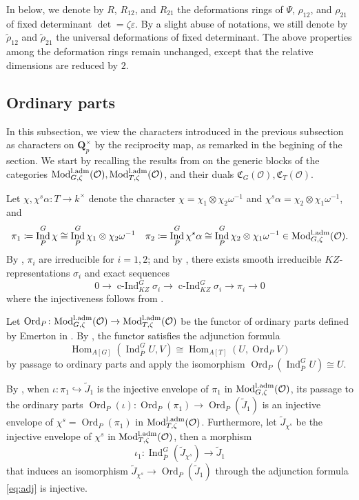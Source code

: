 \documentclass[leqno]{amsart}
\newcommand{\laMod}{\textnormal{Mod}^{\textnormal{l.adm}}}
\DeclareMathOperator{\Ord}{Ord}
\newcommand{\Qp}{\mathbf{Q}_p}
\newcommand{\oo}{\mathcal O}
\newcommand{\1}{\mathbf{1}}
\newcommand{\fC}{\mathfrak C}
\DeclareMathOperator{\Hom}{Hom}
\DeclareMathOperator{\Ind}{Ind}
\DeclareMathOperator{\cInd}{c-Ind}
\theoremstyle{definition}
\theoremstyle{remark}
\begin{document}
In below, we denote by 
$R$,  $R_{12}$, and $R_{21}$
the deformations rings of 
$\Psi$,  $\rho_{12}$, and $\rho_{21}$
of fixed determinant $\det=\zeta\varepsilon$.
By a slight abuse of notations,
we still denote by $\tilde{\rho}_{12}$
and $\tilde{\rho}_{21}$ the universal deformations
of fixed determinant.
The above properties among the deformation rings
remain unchanged,
except that the relative dimensions are reduced by $2$.

\subsection{Ordinary parts}

In this subsection,
we view the characters introduced 
in the previous subsection as characters
on $\Qp^\times$ by the reciprocity map,
as remarked in the begining of the section.
We start by recalling the results from
\cite[\S 7 \S 8]{pask}
on the generic blocks of the categories
$\laMod_{G,\zeta}(\oo), \laMod_{T,\zeta}(\oo)$,
and their duals $\fC_G(\oo), \fC_T(\oo)$.

Let $\chi, \chi^s\alpha\colon T\to k^\times$
denote the character  
$\chi=\chi_1\otimes\chi_2\omega^{-1}$
and  $\chi^s\alpha=\chi_2\otimes \chi_1\omega^{-1}$, and
\[
\pi_1\coloneqq \Ind_{P}^G\chi\cong
\Ind_{P}^G\chi_1\otimes\chi_2\omega^{-1}\quad
\pi_2\coloneqq \Ind_{P}^G\chi^s\alpha\cong 
\Ind_{P}^G\chi_2\otimes\chi_1\omega^{-1} \in \laMod_{G,\zeta}(\oo).
\]
By \cite[Thm 30]{barthel},
$\pi_i$ are irreducible for  $i=1,2$;
and by \cite[Thm 33]{barthel}, there exists
smooth irreducible $KZ$-representations $\sigma_i$
and exact sequences
\begin{equation}
	0\to \cInd_{KZ}^G\sigma_i\to
	\cInd_{KZ}^G\sigma_i\to \pi_i\to 0
\end{equation}
where the injectiveness follows from \cite[Thm 19]{barthel}.


Let
$\Ord_P\colon \laMod_{G,\zeta}(\oo)\to \laMod_{T,\zeta}(\oo)$
be the functor of ordinary parts
defined by Emerton in \cite{emeI}.
By \cite[Thm 4.4.6]{emeI},
the functor satisfies the adjunction formula
\begin{equation}\label{eq:adj}
	\Hom_{A[G]}(\Ind_{\bar{P}}^GU,V)\cong
	\Hom_{A[T]}(U,\Ord_PV)
\end{equation}
by passage to ordinary parts and apply the isomorphism 
$\Ord_P(\Ind_{\bar{P}}^GU)\cong U$.

By \cite[Prop 7.1]{pask},
when $\iota\colon \pi_1\hookrightarrow \tilde{J}_1$
is the injective envelope of $\pi_1$
in $\laMod_{G,\zeta}(\oo)$,
its passage to the ordinary parts
$\Ord_P(\iota)\colon \Ord_P(\pi_1)\to \Ord_P(\tilde{J}_1)$
is an injective envelope of $\chi^s=\Ord_P(\pi_1)$
in $\laMod_{T,\zeta}(\oo)$.
Furthermore, 
let $\tilde{J}_{\chi^s}$
be the injective envelope of $\chi^s$
in $\laMod_{T,\zeta}(\oo)$,
then a morphism
\begin{equation}\label{eq:inj_envelope}
	\iota_1\colon \Ind_{\bar{P}}^G(\tilde{J}_{\chi^s})\to \tilde{J}_1
\end{equation}
that induces an isomorphism 
$\tilde{J}_{\chi^s}\to \Ord_P(\tilde{J}_1)$
through the adjunction formula \eqref{eq:adj}
is injective.
\end{document}
